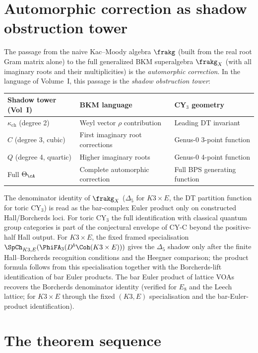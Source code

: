 \section{Automorphic correction as shadow obstruction tower}
\label{sec:automorphic-shadow}

The passage from the naive Kac--Moody algebra $\frakg$ (built
from the real root Gram matrix alone) to the full generalized
BKM superalgebra $\frakg_X$ (with all imaginary roots and their
multiplicities) is the \emph{automorphic correction}. In the
language of Volume~I, this passage is the \emph{shadow
obstruction tower}:
\begin{center}
\renewcommand{\arraystretch}{1.4}
\begin{tabular}{lll}
 \toprule
 \textbf{Shadow tower (Vol~I)}
 & \textbf{BKM language}
 & \textbf{CY$_3$ geometry} \\
 \midrule
 $\kappa_{\mathrm{ch}}$ (degree 2)
 & Weyl vector $\rho$ contribution
 & Leading DT invariant \\
 $C$ (degree 3, cubic)
 & First imaginary root corrections
 & Genus-0 3-point function \\
 $Q$ (degree 4, quartic)
 & Higher imaginary roots
 & Genus-0 4-point function \\
 Full $\Theta_\cA$
 & Complete automorphic correction
 & Full BPS generating function \\
 \bottomrule
\end{tabular}
\end{center}
The denominator identity of $\frakg_X$ ($\Delta_5$ for
$K3 \times E$, the DT partition function for toric CY$_3$) is
read as the bar-complex Euler product only on constructed
Hall/Borcherds loci. For toric CY$_3$ the full identification
with classical quantum group categories is part of the conjectural
envelope of CY-C beyond the positive-half Hall output. For
$K3 \times E$, the fixed framed
specialisation
$\SpCh_{K3,E}(\PhiFA_3(D^b\Coh(K3\times E)))$ gives the
$\Delta_5$ shadow only after the finite Hall--Borcherds recognition
conditions and the Heegner comparison; the product formula follows from
this specialisation together with the Borcherds-lift
identification of bar Euler products. The bar Euler product
of lattice VOAs recovers the Borcherds denominator identity
(verified for $E_8$ and the Leech lattice; for $K3 \times E$
through the fixed $(K3,E)$ specialisation and the
bar-Euler-product identification).

\section{The theorem sequence}
\label{sec:main-results}

